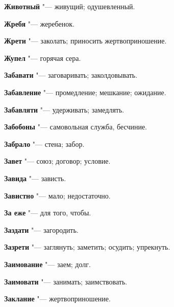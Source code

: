 \begin{mymulticols}{2}
\noindent\textbf{Животный} "--- живущий; одушевленный. 




\noindent\textbf{Жребя} "--- жеребенок. 




\noindent\textbf{Жрети} "--- заколать; приносить жертвоприношение. 




\noindent\textbf{Жупел} "--- горячая сера. 









\noindent\textbf{Забавати} "--- заговаривать; заколдовывать. 




\noindent\textbf{Забавление} "--- промедление; мешкание; ожидание. 




\noindent\textbf{Забавляти} "--- удерживать; замедлять. 




\noindent\textbf{Забобоны} "--- самовольная служба, бесчиние. 




\noindent\textbf{Забрало} "--- стена; забор. 




\noindent\textbf{Завет} "--- союз; договор; условие. 




\noindent\textbf{Завида} "--- зависть. 




\noindent\textbf{Завистно} "--- мало; недостаточно. 




\noindent\textbf{За еже} "--- для того, чтобы. 




\noindent\textbf{Заздати} "--- загородить. 




\noindent\textbf{Зазрети} "--- заглянуть; заметить; осудить; упрекнуть. 




\noindent\textbf{Заимование} "--- заем; долг. 




\noindent\textbf{Заимовати} "--- занимать; заимствовать. 




\noindent\textbf{Заклание} "--- жертвоприношение. 





\end{mymulticols}
